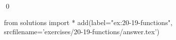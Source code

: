 
\begin{ex}
  \label{ex:20-19-functions}
  
  \qed
\end{ex}
\begin{python0}
from solutions import *
add(label="ex:20-19-functions",
    srcfilename='exercises/20-19-functions/answer.tex')
\end{python0}
